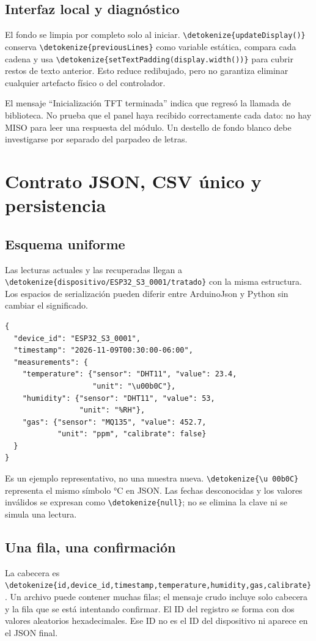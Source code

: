 \documentclass[11pt,a4paper]{article}
\newcommand{\code}[1]{\expandafter\nolinkurl\expandafter{\detokenize{#1}}}
\newcommand{\nextsection}[1]{\clearpage\section{#1}}
\begin{document}
\subsection{Interfaz local y diagnóstico}
El fondo se limpia por completo solo al iniciar. \code{updateDisplay()} conserva \code{previousLines} como variable estática, compara cada cadena y usa \code{setTextPadding(display.width())} para cubrir restos de texto anterior. Esto reduce redibujado, pero no garantiza eliminar cualquier artefacto físico o del controlador.

El mensaje ``Inicialización TFT terminada'' indica que regresó la llamada de biblioteca. No prueba que el panel haya recibido correctamente cada dato: no hay MISO para leer una respuesta del módulo. Un destello de fondo blanco debe investigarse por separado del parpadeo de letras.

\nextsection{Contrato JSON, CSV único y persistencia}
\subsection{Esquema uniforme}
Las lecturas actuales y las recuperadas llegan a \code{dispositivo/ESP32_S3_0001/tratado} con la misma estructura. Los espacios de serialización pueden diferir entre ArduinoJson y Python sin cambiar el significado.
\begin{lstlisting}
{
  "device_id": "ESP32_S3_0001",
  "timestamp": "2026-11-09T00:30:00-06:00",
  "measurements": {
    "temperature": {"sensor": "DHT11", "value": 23.4,
                    "unit": "\u00b0C"},
    "humidity": {"sensor": "DHT11", "value": 53,
                 "unit": "%RH"},
    "gas": {"sensor": "MQ135", "value": 452.7,
            "unit": "ppm", "calibrate": false}
  }
}
\end{lstlisting}
Es un ejemplo representativo, no una muestra nueva. \code{\u00b0C} representa el mismo símbolo °C en JSON. Las fechas desconocidas y los valores inválidos se expresan como \code{null}; no se elimina la clave ni se simula una lectura.

\subsection{Una fila, una confirmación}
La cabecera es \code{id,device_id,timestamp,temperature,humidity,gas,calibrate}. Un archivo puede contener muchas filas; el mensaje crudo incluye solo cabecera y la fila que se está intentando confirmar. El ID del registro se forma con dos valores aleatorios hexadecimales. Ese ID no es el ID del dispositivo ni aparece en el JSON final.
\end{document}
